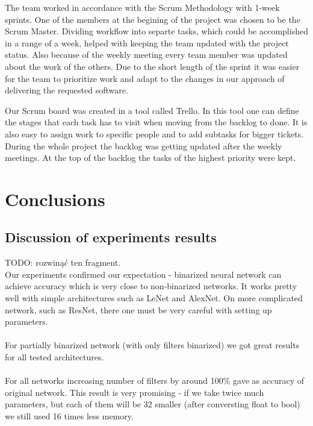 \documentclass[licencjacka]{pracamgr}
\begin{document}
	The team worked in accordance with the Scrum Methodology with 1-week sprints. One of the members at the begining of the project was chosen to be the Scrum Master. Dividing workflow into separte tasks, which could be accomplished in a range of a week, helped with keeping the team updated with the project status. Also because of the weekly meeting every team member was updated about the work of the others. Due to the short length of the sprint it was easier for the team to prioritize work and adapt to the changes in our approach of delivering the requested software.

	Our Scrum board was created in a tool called Trello. In this tool one can define the stages that each task has to visit when moving from the backlog to done. It is also easy to assign work to specific people and to add subtasks for bigger tickets. During the whole project the backlog was getting updated after the weekly meetings. At the top of the backlog the tasks of the highest priority were kept.

\chapter{Conclusions}
	\section{Discussion of experiments results}
		TODO: rozwinąć ten fragment. \\
		Our experiments confirmed our expectation - binarized neural network can achieve accuracy which is very close to non-binarized networks. It works pretty well with simple architectures such as LeNet and AlexNet. On more complicated network, such as ResNet, there one must be very careful with setting up parameters. 
		\\\\
		For partially binarized network (with only filters binarized) we got great results for all tested architectures.
		\\\\
		For all networks increasing number of filters by around 100\% gave as accuracy of original network. This result is very promising - if we take twice much parameters, but each of them will be 32 smaller (after conversting float to bool) we still used 16 times less memory.
\end{document}
